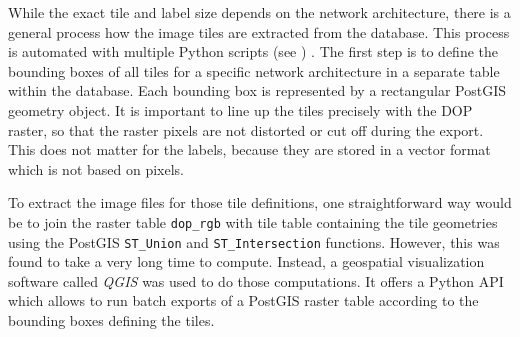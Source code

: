 While the exact tile and label size depends on the network architecture, there is a general process how the image tiles are extracted from the database. This process is automated with multiple Python scripts (see ) . The first step is to define the bounding boxes of all tiles for a specific network architecture in a separate table within the database. Each bounding box is represented by a rectangular PostGIS geometry object. It is important to line up the tiles precisely with the DOP raster, so that the raster pixels are not distorted or cut off during the export. This does not matter for the labels, because they are stored in a vector format which is not based on pixels.

To extract the image files for those tile definitions, one straightforward way would be to join the raster table \texttt{dop\_rgb} with tile table containing the tile geometries using the PostGIS \texttt{ST\_Union} and \texttt{ST\_Intersection} functions. However, this was found to take a very long time to compute. Instead, a geospatial visualization software called \emph{QGIS} was used to do those computations. It offers a Python API which allows to run batch exports of a PostGIS raster table according to the bounding boxes defining the tiles.


